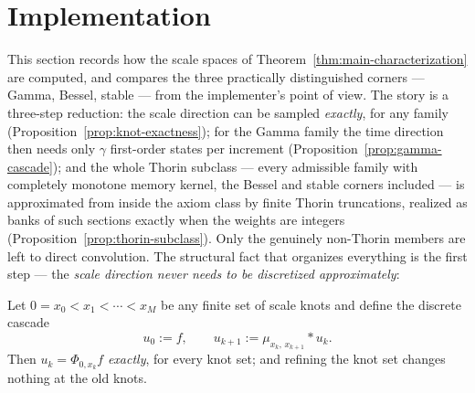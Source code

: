 
\section{Implementation}\label{sec:implementation}

This section records how the scale spaces of Theorem~\ref{thm:main-characterization} are
computed, and compares the three practically distinguished corners --- Gamma, Bessel, stable
--- from the implementer's point of view. The story is a three-step reduction: the scale
direction can be sampled \emph{exactly}, for any family
(Proposition~\ref{prop:knot-exactness}); for the Gamma family the time direction then needs
only $\gamma$ first-order states per increment (Proposition~\ref{prop:gamma-cascade}); and
the whole Thorin subclass --- every admissible family with completely monotone memory
kernel, the Bessel and stable corners included --- is approximated from inside the axiom
class by finite Thorin truncations, realized as banks of such sections exactly when the
weights are integers (Proposition~\ref{prop:thorin-subclass}). Only the genuinely non-Thorin members are left to
direct convolution. The structural fact that organizes everything is the first step --- the
\emph{scale direction never needs to be discretized approximately}:

\begin{proposition}\label{prop:knot-exactness}
Let $0 = x_0 < x_1 < \cdots < x_M$ be any finite set of scale knots and define the discrete
cascade
\[
  u_0 := f, \qquad u_{k+1} := \mu_{x_k,\,x_{k+1}} * u_k .
\]
Then $u_k = \Phi_{0, x_k} f$ \emph{exactly}, for every knot set; and refining the knot set
changes nothing at the old knots.
\end{proposition}

